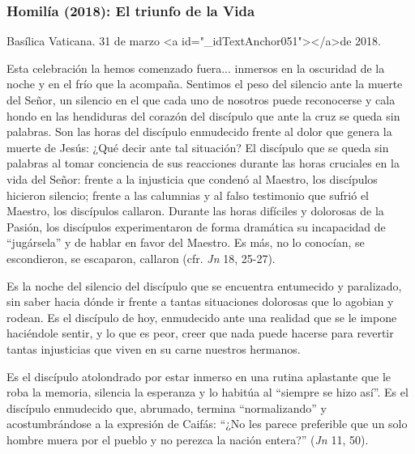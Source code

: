 			\subsubsection{Homilía (2018): El triunfo de la Vida }
			
			\begin{referencia}Basílica Vaticana. 31 de marzo <a id="_idTextAnchor051"></a>de 2018.\end{referencia}
			
			\begin{body}Esta celebración la hemos comenzado fuera... inmersos en la oscuridad de la noche y en el frío que la acompaña. Sentimos el peso del silencio ante la muerte del Señor, un silencio en el que cada uno de nosotros puede reconocerse y cala hondo en las hendiduras del corazón del discípulo que ante la cruz se queda sin palabras. Son las horas del discípulo enmudecido frente al dolor que genera la muerte de Jesús: ¿Qué decir ante tal situación? El discípulo que se queda sin palabras al tomar conciencia de sus reacciones durante las horas cruciales en la vida del Señor: frente a la injusticia que condenó al Maestro, los discípulos hicieron silencio; frente a las calumnias y al falso testimonio que sufrió el Maestro, los discípulos callaron. Durante las horas difíciles y dolorosas de la Pasión, los discípulos experimentaron de forma dramática su incapacidad de “jugársela” y de hablar en favor del Maestro. Es más, no lo conocían, se escondieron, se escaparon, callaron (cfr. \textit{Jn} 18, 25-27). \end{body}
			
			\begin{body}Es la noche del silencio del discípulo que se encuentra entumecido y paralizado, sin saber hacia dónde ir frente a tantas situaciones dolorosas que lo agobian y rodean. Es el discípulo de hoy, enmudecido ante una realidad que se le impone haciéndole sentir, y lo que es peor, creer que nada puede hacerse para revertir tantas injusticias que viven en su carne nuestros hermanos. \end{body}
			
			\begin{body}Es el discípulo atolondrado por estar inmerso en una rutina aplastante que le roba la memoria, silencia la esperanza y lo habitúa al “siempre se hizo así”. Es el discípulo enmudecido que, abrumado, termina “normalizando” y acostumbrándose a la expresión de Caifás: “¿No les parece preferible que un solo hombre muera por el pueblo y no perezca la nación entera?” (\textit{Jn} 11, 50). \end{body}
			
